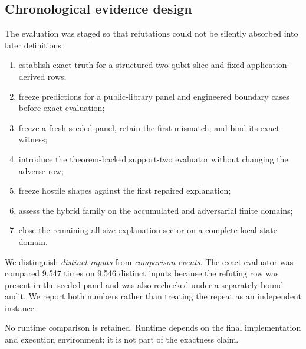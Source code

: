 \subsection{Chronological evidence design}

The evaluation was staged so that refutations could not be silently absorbed into later definitions:
\begin{enumerate}
  \item establish exact truth for a structured two-qubit slice and fixed application-derived rows;
  \item freeze predictions for a public-library panel and engineered boundary cases before exact evaluation;
  \item freeze a fresh seeded panel, retain the first mismatch, and bind its exact witness;
  \item introduce the theorem-backed support-two evaluator without changing the adverse row;
  \item freeze hostile shapes against the first repaired explanation;
  \item assess the hybrid family on the accumulated and adversarial finite domains;
  \item close the remaining all-size explanation sector on a complete local state domain.
\end{enumerate}

We distinguish \emph{distinct inputs} from \emph{comparison events}. The exact evaluator was compared 9,547 times on 9,546 distinct inputs because the refuting row was present in the seeded panel and was also rechecked under a separately bound audit. We report both numbers rather than treating the repeat as an independent instance.

No runtime comparison is retained. Runtime depends on the final implementation and execution environment; it is not part of the exactness claim.

